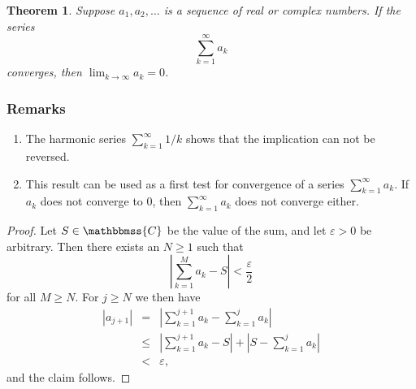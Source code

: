 \documentclass[12pt]{article}
\newcommand{\C}{\mathbbmss{C}}
\newtheorem{thm}{Theorem}
\begin{document}
\begin{thm} Suppose $a_1,a_2, \ldots$ is a sequence of real or complex numbers.
If the series
$$
  \sum_{k=1}^\infty a_k
$$
converges, then $\lim_{k\to \infty} a_k = 0$.
\end{thm}

\subsubsection*{Remarks}
\begin{enumerate}
\item 
The harmonic series $\sum_{k=1}^\infty 1/k$ shows that the 
implication can not be reversed. 
\item This result can be used as a first test for convergence of a series
  $\sum_{k=1}^\infty a_k$. If $a_k$ does not converge to $0$, then 
  $\sum_{k=1}^\infty a_k$ does not converge either. 
\end{enumerate}

\begin{proof} Let $S\in \C$ be the value of the sum, and let $\varepsilon>0$
be arbitrary. Then there exists an $N\ge 1$ such that 
$$
  | \sum_{k=1}^M a_k -S | < \frac{\varepsilon}{2}
$$
for all $M\ge N$. For $j\ge N$ we then have
\begin{eqnarray*}
|a_{j+1}| &=& | \sum_{k=1}^{j+1} a_k -\sum_{k=1}^j a_k| \\
          &\le & | \sum_{k=1}^{j+1} a_k -S | + |S - \sum_{k=1}^j a_k| \\
          &<& \varepsilon,
\end{eqnarray*}
and the claim follows.
\end{proof}
\end{document}
